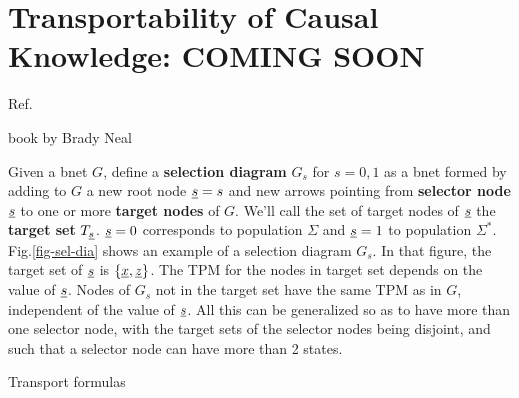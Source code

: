 \chapter{Transportability
of Causal Knowledge: COMING SOON}
\label{ch-transport}





Ref.\cite{pearl2011trans}

book by Brady Neal \cite{book-brady-neal}



Given a bnet $G$, define a
{\bf selection diagram} $G_s$ for $s=0,1$
as a bnet 
formed by adding to $G$ a new root node ${\underline{s}}=s$
and new arrows pointing
from {\bf selector node}
${\underline{s}}$ to one
or more {\bf target nodes} of $G$.
We'll call the set 
of target nodes 
of ${\underline{s}}$ the {\bf target set} $T_{\underline{s}}$.
${\underline{s}}=0$ corresponds to population $\Sigma$
and ${\underline{s}}=1$ to population $\Sigma^*$.
Fig.\ref{fig-sel-dia}
shows an example
of a selection diagram $G_s$.
In that figure, the target set 
of ${\underline{s}}$ is 
$\{{\underline{x}}, {\underline{z}}\}$.
The TPM for the nodes in target set 
depends on the value of ${\underline{s}}$.
Nodes of $G_s$ not in
the target set have the same TPM as in $G$,
independent of the value of ${\underline{s}}$.
All this can be generalized so as to 
have more than one selector node,
with the target sets
of the selector nodes being disjoint, and such that a
selector node
can have more than 2 states.

Transport formulas

